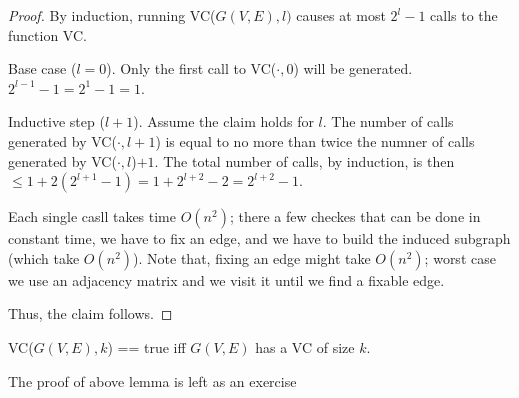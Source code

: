     \begin{proof}
        By induction, running VC($G(V,E), l)$ causes at most $2^l - 1$ calls to the function VC.

        Base case ($l = 0$). Only the first call to VC($\cdot, 0$) will be generated. $2^{l-1} - 1 = 2^1 - 1 = 1$.

        Inductive step ($l+1$). Assume the claim holds for $l$. The number of calls generated by VC($\cdot, l+1$) is equal to no more than twice the numner of calls generated by VC($\cdot, l$)$+1$.
        The total number of calls, by induction, is then $\leq 1 + 2(2^{l+1}-1) = 1 + 2^{l+2} - 2 = 2^{l+2} - 1$.

        Each single casll takes time $O(n^2)$; there a few checkes that can be done in constant time, we have to fix an edge, and we have to build the induced subgraph (which take $O(n^2)$).
        Note that, fixing an edge might take $O(n^2)$; worst case we use an adjacency matrix and we visit it until we find a fixable edge.

        Thus, the claim follows.
    \end{proof}

    \begin{lemma}
        VC($G(V,E), k$) == true iff $G(V,E)$ has a VC of size $k$.
    \end{lemma}

    \begin{exercise}
        The proof of above lemma is left as an exercise
    \end{exercise}